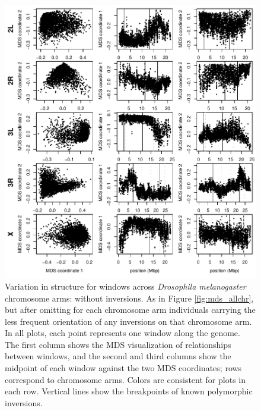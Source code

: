 \documentclass[11pt, oneside]{article}   	%
\begin{document}
\begin{figure}
    \begin{center}
        \includegraphics{MDS_allchr_Together_plot_samples_noinv}
    \end{center}
    \caption{
        Variation in structure for windows across \textit{Drosophila melanogaster} chromosome arms: without inversions.
         As in Figure \ref{fig:mds_allchr}, but after omitting for each chromosome arm individuals carrying the less frequent orientation
         of any inversions on that chromosome arm.
        In all plots, each point represents one window along the genome.
         The first column shows the MDS visualization of relationships between windows, 
         and the second and third columns show the midpoint of each window against the two MDS coordinates; 
         rows correspond to chromosome arms.
         Colors are consistent for plots in each row. 
         Vertical lines show the breakpoints of known polymorphic inversions.   
         \label{sfig:mds_allchr_noinversions}
    }
\end{figure}
\end{document}
